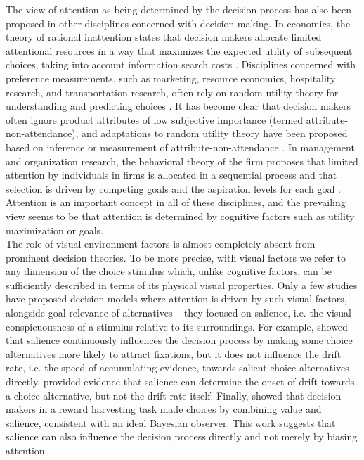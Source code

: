 The view of attention as being determined by the decision process has also been proposed in other disciplines concerned with decision making. In economics, the theory of rational inattention states that decision makers allocate limited attentional resources in a way that maximizes the expected utility of subsequent choices, taking into account information search costs \citep{sims2003}. Disciplines concerned with preference measurements, such as marketing, resource economics, hospitality research, and transportation research, often rely on random utility theory for understanding and predicting choices \citep{louviere2000}. It has become clear that decision makers often ignore product attributes of low subjective importance (termed attribute-non-attendance), and adaptations to random utility theory have been proposed based on inference or measurement of attribute-non-attendance \citep{vanloo2018}. In management and organization research, the behavioral theory of the firm proposes that limited attention by individuals in firms is allocated in a sequential process and that selection is driven by competing goals and the aspiration levels for each goal \citep{ocasio2011}. Attention is an important concept in all of these disciplines, and the prevailing view seems to be that attention is determined by cognitive factors such as utility maximization or goals. \\

The role of visual environment factors is almost completely absent from prominent decision theories. To be more precise, with visual factors we refer to any dimension of the choice stimulus which, unlike cognitive factors, can be sufficiently described in terms of its physical visual properties. Only a few studies have proposed decision models where attention is driven by such visual factors, alongside goal relevance of alternatives -- they focused on salience, i.e. the visual conspicuousness of a stimulus relative to its surroundings. For example, \cite{towal2013a} showed that salience continuously influences the decision process by making some choice alternatives more likely to attract fixations, but it does not influence the drift rate, i.e. the speed of accumulating evidence, towards salient choice alternatives directly. \cite{chen2013} provided evidence that salience can determine the onset of drift towards a choice alternative, but not the drift rate itself. Finally, \cite{navalpakkam2010} showed that decision makers in a reward harvesting task made choices by combining value and salience, consistent with an ideal Bayesian observer. This work suggests that salience can also influence the decision process directly and not merely by biasing attention.\\ 

